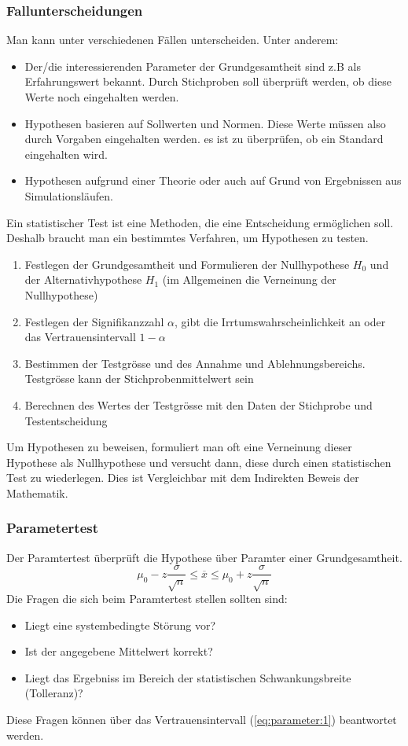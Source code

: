 \subsubsection{Fallunterscheidungen}
Man kann unter verschiedenen Fällen unterscheiden. Unter anderem:
\begin{itemize}
\item Der/die interessierenden Parameter der Grundgesamtheit sind z.B als Erfahrungswert bekannt. Durch Stichproben soll überprüft werden, ob diese Werte noch eingehalten werden. \item Hypothesen basieren auf Sollwerten und Normen. Diese Werte müssen also durch Vorgaben eingehalten werden. es ist zu überprüfen, ob ein Standard eingehalten wird.
\item Hypothesen aufgrund einer Theorie oder auch auf Grund von Ergebnissen aus Simulationsläufen.
\end{itemize}
Ein statistischer Test ist eine Methoden, die eine Entscheidung ermöglichen soll. Deshalb braucht man ein bestimmtes Verfahren, um Hypothesen zu testen.
\begin{enumerate}
\item Festlegen der Grundgesamtheit und Formulieren der Nullhypothese $H_0$ und der Alternativhypothese $H_1$ (im Allgemeinen die Verneinung der Nullhypothese)
\item Festlegen der Signifikanzzahl $\alpha$, gibt die Irrtumswahrscheinlichkeit an oder das Vertrauensintervall $1-\alpha$
\item Bestimmen der Testgrösse und des Annahme und Ablehnungsbereichs. Testgrösse kann der Stichprobenmittelwert sein
\item Berechnen des Wertes der Testgrösse mit den Daten der Stichprobe und Testentscheidung
\end{enumerate}
Um Hypothesen zu beweisen, formuliert man oft eine Verneinung dieser Hypothese als Nullhypothese und versucht dann, diese durch einen statistischen Test zu wiederlegen. Dies ist Vergleichbar mit dem Indirekten Beweis der Mathematik.
\subsubsection{Parametertest}
Der Paramtertest überprüft die Hypothese über Paramter einer Grundgesamtheit.
\begin{equation}
\mu_{0} - z \frac{\sigma}{\sqrt{n}}\leq\overline{x}\leq\mu_{0}+z \frac{\sigma}{\sqrt{n}} \label{eq:parameter:1}
\end{equation}
Die Fragen die sich beim Paramtertest stellen sollten sind:
\begin{itemize}
\item Liegt eine systembedingte Störung vor?
\item Ist der angegebene Mittelwert korrekt?
\item Liegt das Ergebniss im Bereich der statistischen Schwankungsbreite (Tolleranz)?
\end{itemize}
Diese Fragen können über das Vertrauensintervall (\autoref{eq:parameter:1}) beantwortet werden.
